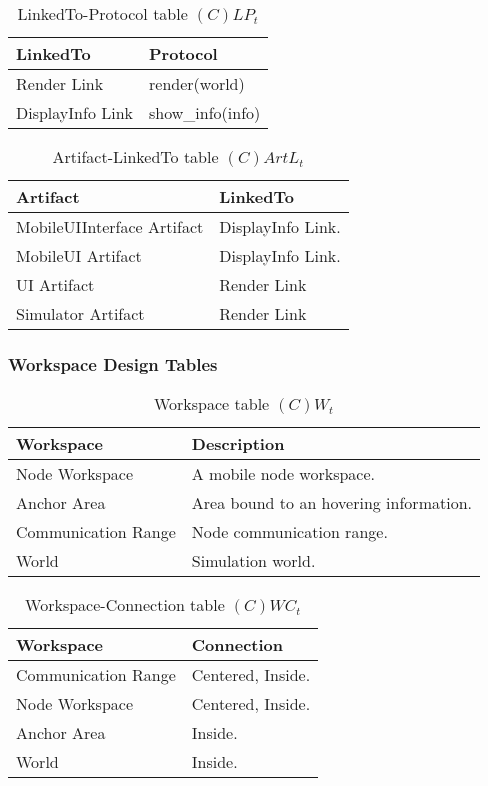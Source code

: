 \begin{table}[H]
	\centering
	\begin{tabular}{|p{4cm}|p{8cm}|}
			\hline
			\textbf{LinkedTo} & \textbf{Protocol} \\
			\hline
			Render Link & render(world) \\
			\hline
			DisplayInfo Link & show\_info(info) \\
			\hline
		\end{tabular}
	\caption{LinkedTo-Protocol table $(C)LP_t$}
	\label{tab:clpt}
\end{table}

\begin{table}[H]
	\centering
	\begin{tabular}{|p{4cm}|p{8cm}|}
			\hline
			\textbf{Artifact} & \textbf{LinkedTo} \\
			\hline
			MobileUIInterface Artifact & DisplayInfo Link. \\
			\hline
			MobileUI Artifact & DisplayInfo Link. \\
			\hline
			UI Artifact & Render Link \\
			\hline
			Simulator Artifact & Render Link \\
      \hline
		\end{tabular}
	\caption{Artifact-LinkedTo table $(C)ArtL_t$}
	\label{tab:cartlt}
\end{table}

\subsubsection{Workspace Design Tables}

\begin{table}[H]
	\centering
	\begin{tabular}{|p{4cm}|p{8cm}|}
			\hline
			\textbf{Workspace} & \textbf{Description} \\
			\hline
			Node Workspace  & A mobile node workspace. \\
			\hline
			Anchor Area  & Area bound to an hovering information. \\
			\hline
			Communication Range  & Node communication range. \\
			\hline
			World  & Simulation world. \\
			\hline
		\end{tabular}
	\caption{Workspace table $(C)W_t$}
	\label{tab:cwt}
\end{table}

\begin{table}[H]
	\centering
	\begin{tabular}{|p{4cm}|p{8cm}|}
			\hline
			\textbf{Workspace} & \textbf{Connection} \\
			\hline
			Communication Range & Centered, Inside. \\
			\hline
			Node Workspace & Centered, Inside. \\
			\hline
			Anchor Area & Inside. \\
			\hline
			World  & Inside. \\
			\hline
		\end{tabular}
	\caption{Workspace-Connection table $(C)WC_t$}
	\label{tab:cwct}
\end{table}

